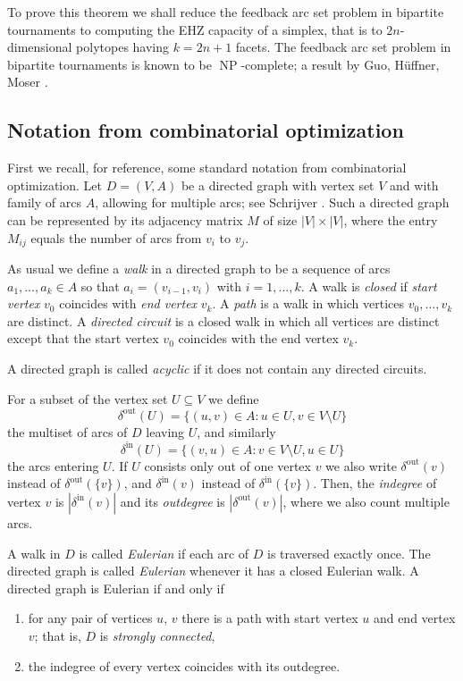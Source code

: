 \documentclass{amsart}
\DeclareMathOperator{\NP}{NP}
\newcommand{\deltain}{\delta^{\mathrm{in}}}
\newcommand{\deltaout}{\delta^{\mathrm{out}}}
\begin{document}
To prove this theorem we shall reduce the feedback arc set problem in
bipartite tournaments to computing the EHZ capacity of a simplex, that
is to $2n$-dimensional polytopes having $k = 2n+1$ facets. The feedback
arc set problem in bipartite tournaments is known to be
$\NP$-complete; a result by Guo, H\"uffner, Moser
\cite{Guo-Hueffner-Moser-2007}.

%

\subsection{Notation from combinatorial optimization}

First we recall, for reference, some standard notation from
combinatorial optimization.  Let $D = (V, A)$ be a directed graph with
vertex set $V$ and with family of arcs $A$, allowing for multiple
arcs; see Schrijver \cite{Schrijver-2003}. Such a directed graph can
be represented by its adjacency matrix $M$ of size $|V| \times |V|$,
where the entry $M_{ij}$ equals the number of arcs from $v_i$ to $v_j$.

\smallskip

As usual we define a \emph{walk} in a directed graph to be a sequence
of arcs $a_1, \ldots, a_k \in A$ so that $a_i = (v_{i-1},v_i)$ with
$i = 1, \ldots, k$. A walk is \emph{closed} if \emph{start vertex} $v_0$
coincides with \emph{end vertex} $v_k$. A \emph{path} is a walk in which
vertices $v_0, \ldots, v_k$ are distinct. A \emph{directed circuit} is
a closed walk in which all vertices are distinct except that the start
vertex $v_0$ coincides with the end vertex $v_k$.

A directed graph is called \emph{acyclic} if it does not contain any
directed circuits.

For a subset of the vertex set $U \subseteq V$ we define
\[
  \deltaout(U) = \{(u,v) \in A : u \in U, v \in V \setminus
  U\}
\]
the multiset of arcs of $D$ leaving $U$, and similarly
\[
  \deltain(U) = \{(v,u) \in A : v \in V \setminus U, u \in U\}
\]
the arcs entering $U$. If $U$ consists only out of one vertex $v$ we
also write $\deltaout(v)$ instead of $\deltaout(\{v\})$, and
$\deltain(v)$ instead of $\deltain(\{v\})$. Then, the \emph{indegree}
of vertex $v$ is $|\deltain(v)|$ and its \emph{outdegree} is
$|\deltaout(v)|$, where we also count multiple arcs.

A walk in $D$ is called \emph{Eulerian} if each arc of $D$ is
traversed exactly once. The directed graph is called \emph{Eulerian}
whenever it has a closed Eulerian walk. A directed graph is Eulerian
if and only if
\begin{enumerate}
\item for any pair of vertices $u$, $v$ there is a path with start
  vertex $u$ and end vertex $v$; that is, $D$ is \emph{strongly connected},
\item the indegree of every vertex coincides with its outdegree.
\end{enumerate}
\end{document}
